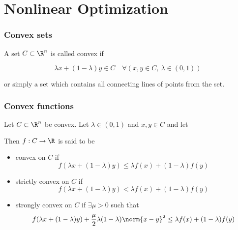 
\section{Nonlinear Optimization}\label{d1c9db1}

\subsubsection{Convex sets}

A set $C\subset\R^n$ is called convex if

$$
	\lambda x  + (1-\lambda ) y \in C
	\quad
	\forall(x,y\in C,\ \lambda \in (0, 1))
$$

or simply a set which contains all connecting lines of points from the
set.

\subsubsection{Convex functions}

Let $C\subset\R^n$ be convex. Let $\lambda\in(0,1)$ and $x,y\in C$ and
let

Then $f:C\to\R$ is said to be

\begin{itemize}
	\item convex on $C$ if
	      $$f(\lambda x+(1-\lambda)y)\leq\lambda f(x)+(1-\lambda)f(y)$$
	\item strictly convex on $C$ if
	      $$f(\lambda x+(1-\lambda)y)<\lambda f(x)+(1-\lambda)f(y)$$
	\item strongly convex on $C$ if $\exists\mu>0$ such that
	      $$f(\lambda x+(1-\lambda)y)+\frac{\mu}{2}\lambda(1-\lambda)\norm{x-y}^2\leq\lambda f(x)+(1-\lambda)f(y)$$
\end{itemize}
